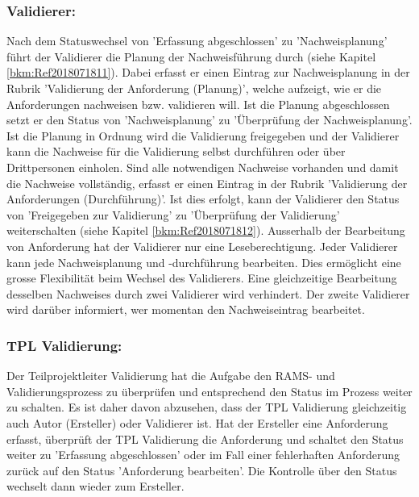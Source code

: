 \subsubsection{Validierer:} 
Nach dem Statuswechsel von 'Erfassung abgeschlossen' zu 'Nachweisplanung' führt der Validierer die Planung der Nachweisführung durch (siehe Kapitel \ref{bkm:Ref2018071811}). Dabei erfasst er einen Eintrag zur Nachweisplanung in der Rubrik 'Validierung der Anforderung (Planung)', welche aufzeigt, wie er die Anforderungen nachweisen bzw. validieren will. Ist die Planung abgeschlossen setzt er den Status von 'Nachweisplanung' zu 'Überprüfung der Nachweisplanung'. \\

Ist die Planung in Ordnung wird die Validierung freigegeben und der Validierer kann die Nachweise für die Validierung selbst durchführen oder über Drittpersonen einholen. Sind alle notwendigen Nachweise vorhanden und damit die Nachweise vollständig, erfasst er einen Eintrag in der Rubrik 'Validierung der Anforderungen (Durchführung)'. Ist dies erfolgt, kann der Validierer den Status von 'Freigegeben zur Validierung' zu 'Überprüfung der Validierung' weiterschalten (siehe Kapitel \ref{bkm:Ref2018071812}). 
Ausserhalb der Bearbeitung von Anforderung hat der Validierer nur eine Leseberechtigung. Jeder Validierer kann jede Nachweisplanung und -durchführung bearbeiten. Dies ermöglicht eine grosse Flexibilität beim Wechsel des Validierers. Eine gleichzeitige Bearbeitung desselben Nachweises durch zwei Validierer wird verhindert. Der zweite Validierer wird darüber informiert, wer momentan den Nachweiseintrag bearbeitet.

\subsubsection{TPL Validierung:}

Der Teilprojektleiter Validierung hat die Aufgabe den RAMS- und Validierungsprozess zu überprüfen und entsprechend den Status im Prozess weiter zu schalten. Es ist daher davon abzusehen, dass der TPL Validierung gleichzeitig auch Autor (Ersteller) oder Validierer ist. Hat der Ersteller eine Anforderung erfasst, überprüft der TPL Validierung die Anforderung und schaltet den Status weiter zu 'Erfassung abgeschlossen' oder im Fall einer fehlerhaften Anforderung zurück auf den Status 'Anforderung bearbeiten'. Die Kontrolle über den Status wechselt dann wieder zum Ersteller. \\

